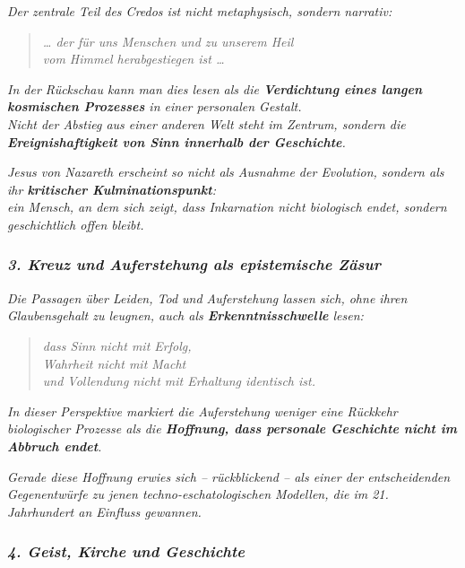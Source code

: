 \documentclass[
]{article}
\begin{document}
\emph{Der zentrale Teil des Credos ist nicht metaphysisch, sondern narrativ:}

\begin{quote}
\emph{\ldots{} der für uns Menschen und zu unserem Heil\\
vom Himmel herabgestiegen ist \ldots{}}
\end{quote}

\emph{In der Rückschau kann man dies lesen als die \textbf{Verdichtung eines langen kosmischen Prozesses} in einer personalen Gestalt.\\
Nicht der Abstieg aus einer anderen Welt steht im Zentrum, sondern die \textbf{Ereignishaftigkeit von Sinn innerhalb der Geschichte}.}

\emph{Jesus von Nazareth erscheint so nicht als Ausnahme der Evolution, sondern als ihr \textbf{kritischer Kulminationspunkt}:\\
ein Mensch, an dem sich zeigt, dass Inkarnation nicht biologisch endet, sondern geschichtlich offen bleibt.}

\subsubsection{\texorpdfstring{\emph{\textbf{3. Kreuz und Auferstehung als epistemische Zäsur}}}{3. Kreuz und Auferstehung als epistemische Zäsur}}\label{kreuz-und-auferstehung-als-epistemische-zuxe4sur}

\emph{Die Passagen über Leiden, Tod und Auferstehung lassen sich, ohne ihren Glaubensgehalt zu leugnen, auch als \textbf{Erkenntnisschwelle} lesen:}

\begin{quote}
\emph{dass Sinn nicht mit Erfolg,\\
Wahrheit nicht mit Macht\\
und Vollendung nicht mit Erhaltung identisch ist.}
\end{quote}

\emph{In dieser Perspektive markiert die Auferstehung weniger eine Rückkehr biologischer Prozesse als die \textbf{Hoffnung, dass personale Geschichte nicht im Abbruch endet}.}

\emph{Gerade diese Hoffnung erwies sich -- rückblickend -- als einer der entscheidenden Gegenentwürfe zu jenen techno-eschatologischen Modellen, die im 21. Jahrhundert an Einfluss gewannen.}

\subsubsection{\texorpdfstring{\emph{\textbf{4. Geist, Kirche und Geschichte}}}{4. Geist, Kirche und Geschichte}}\label{geist-kirche-und-geschichte}
\end{document}
